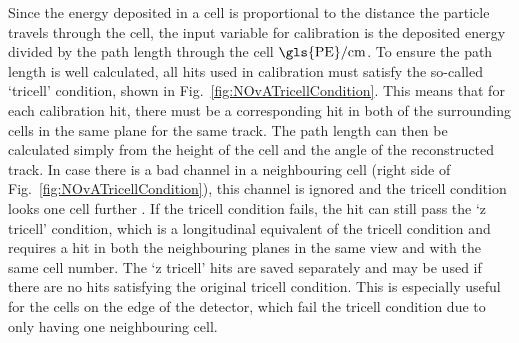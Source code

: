 Since the energy deposited in a cell is proportional to the distance the particle travels through the cell, the input variable for calibration is the deposited energy divided by the path length through the cell $\unit{\gls{PE}/cm}$. To ensure the path length is well calculated, all hits used in calibration must satisfy the so-called `tricell' condition, shown in Fig.~\ref{fig:NOvATricellCondition}. This means that for each calibration hit, there must be a corresponding hit in both of the surrounding cells in the same plane for the same track. The path length can then be calculated simply from the height of the cell and the angle of the reconstructed track. In case there is a bad channel in a neighbouring cell (right side of Fig.~\ref{fig:NOvATricellCondition}), this channel is ignored and the tricell condition looks one cell further \cite{PrabhjotNOvAThesis_CalibrationAndOscResults2019.pdf}. If the tricell condition fails, the hit can still pass the `z tricell' condition, which is a longitudinal equivalent of the tricell condition and requires a hit in both the neighbouring planes in the same view and with the same cell number. The `z tricell' hits are saved separately and may be used if there are no hits satisfying the original tricell condition. This is especially useful for the cells on the edge of the detector, which fail the tricell condition due to only having one neighbouring cell.

